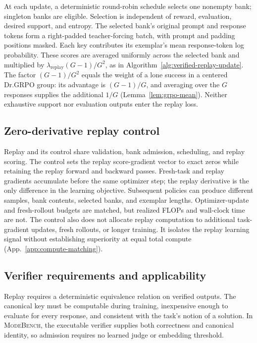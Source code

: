 \documentclass{article}
\newcommand{\1}{\mathbf 1}
\newcommand{\mb}{\textsc{ModeBench}}
\theoremstyle{remark}
\theoremstyle{definition}
\theoremstyle{plain}
\begin{document}
At each update, a deterministic round-robin schedule selects one nonempty
bank; singleton banks are eligible. Selection is
independent of reward, evaluation, desired support, and entropy. The selected
bank's original prompt and response tokens form a right-padded
teacher-forcing batch, with prompt and padding positions masked. Each key
contributes its exemplar's mean response-token log probability. These scores
are averaged uniformly across the selected bank and multiplied by
$\lambda_{\mathrm{replay}}(G-1)/G^2$, as in
Algorithm~\ref{alg:verified-replay-update}. The factor $(G-1)/G^2$ equals the
weight of a lone success in a centered Dr.GRPO group: its advantage is
$(G-1)/G$, and averaging over the $G$ responses supplies the additional
$1/G$ (Lemma~\ref{lem:grpo-mean}). Neither exhaustive support nor evaluation
outputs enter the replay loss.

\subsection{Zero-derivative replay control}
\label{app:algorithm-control}

Replay and its control share validation, bank admission, scheduling, and
replay scoring. The control sets the replay score-gradient vector to exact
zeros while retaining the replay forward and backward passes. Fresh-task
and replay gradients accumulate before the same optimizer step; the
replay derivative is the only difference in the learning objective.
Subsequent policies can produce different samples, bank contents, selected
banks, and exemplar lengths. Optimizer-update and fresh-rollout budgets are
matched, but realized FLOPs and wall-clock time are not. The control also
does not allocate replay computation to additional task-gradient updates,
fresh rollouts, or longer training. It isolates the replay learning signal
without establishing superiority at equal total compute
(App.~\ref{app:compute-matching}).

\subsection{Verifier requirements and applicability}
\label{app:algorithm-identity}

Replay requires a deterministic equivalence relation on verified outputs.
The canonical key must be computable during training, inexpensive enough to
evaluate for every response, and consistent with the task's notion of a
solution. In \mb{}, the executable verifier supplies both correctness and
canonical identity, so admission requires no learned judge or embedding
threshold.
\end{document}
